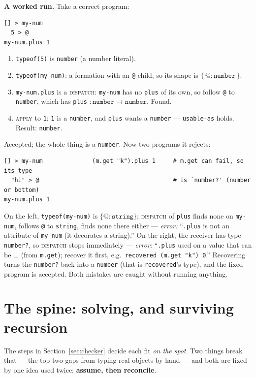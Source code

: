 \documentclass[10pt]{article}
\newcommand{\ty}[1]{\mathtt{#1}}     %
\newcommand{\arr}{\to}               %
\begin{document}
\noindent\textbf{A worked run.} Take a correct program:
\begin{lstlisting}
[] > my-num
  5 > @
my-num.plus 1
\end{lstlisting}
\begin{enumerate}\setlength{\itemsep}{1pt}
\item \verb|typeof(5)| is \verb|number| (a number literal).
\item \verb|typeof(my-num)|: a formation with an \verb|@| child, so its shape is
  $\{\,\ty{@}:\ty{number}\,\}$.
\item \verb|my-num.plus| is a \textsc{dispatch}: \verb|my-num| has no
  \verb|plus| of its own, so follow \verb|@| to \verb|number|, which has
  \verb|plus| $:\ty{number}\arr\ty{number}$. Found.
\item \textsc{apply} to \verb|1|: \verb|1| is a \verb|number|, and \verb|plus|
  wants a \verb|number| --- \verb|usable-as| holds. Result: \verb|number|.
\end{enumerate}
Accepted; the whole thing is a \verb|number|. Now two programs it rejects:
\begin{lstlisting}
[] > my-num              (m.get "k").plus 1     # m.get can fail, so its type
  "hi" > @                                      # is `number?' (number or bottom)
my-num.plus 1
\end{lstlisting}
On the left, \verb|typeof(my-num)| is $\{\ty{@}:\ty{string}\}$; \textsc{dispatch}
of \verb|plus| finds none on \verb|my-num|, follows \verb|@| to \verb|string|,
finds none there either --- \emph{error:} ``\texttt{.plus} is not an attribute of
\texttt{my-num} (it decorates a string).'' On the right, the receiver has type
\verb|number?|, so \textsc{dispatch} stops immediately --- \emph{error:}
``\texttt{.plus} used on a value that can be $\bot$ (from \texttt{m.get});
recover it first, e.g.\ \texttt{recovered (m.get "k") 0}.'' Recovering turns the
\verb|number?| back into a \verb|number| (that is \verb|recovered|'s type), and
the fixed program is accepted. Both mistakes are caught without running
anything.

\section{The spine: solving, and surviving recursion}\label{sec:spine}

The steps in Section~\ref{sec:checker} decide each fit \emph{on the spot}. Two
things break that --- the top two gaps from typing real objects by hand --- and
both are fixed by one idea used twice: \textbf{assume, then reconcile}.
\end{document}
